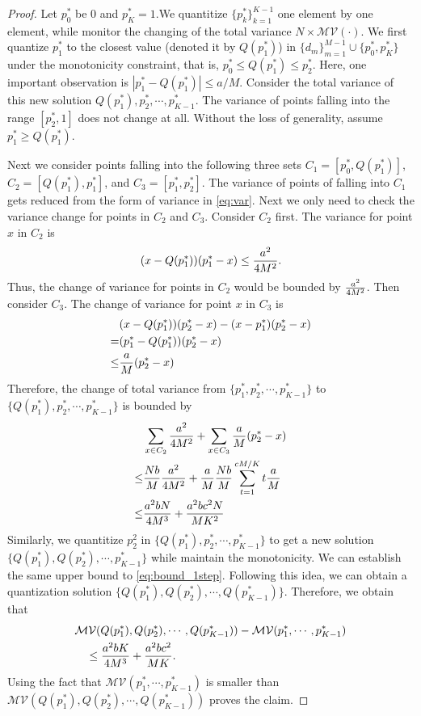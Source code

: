 \documentclass{article}
\begin{document}
\begin{proof}
Let $p^*_0$ be $0$ and $p^*_K=1$.We quantitize $\{p^*_k\}_{k=1}^{K-1}$ one element by one element, while monitor the changing of the total variance $N \times \mathcal{MV(\cdot)}$. We first quantize $p^*_1$ to the closest value (denoted it by $Q(p^*_1)$) in $\{d_m\}_{m=1}^{M-1} \cup \{p^*_0,p^*_K\}$ under the monotonicity constraint, that is, $p^*_0\leq Q(p^*_1) \leq p^*_2$. Here, one important observation is $|p^*_{1} - Q(p^*_1)|\leq a/M$. Consider the total variance of this new solution $Q(p^*_1), p^*_2, \cdots, p^*_{K-1}$. The variance of points falling into the range $[p^*_2, 1]$ does not change at all. Without the loss of generality, assume $p^*_{1} \geq Q(p^*_1)$.

Next we consider points falling into the following three sets $C_1 = [p^*_0, Q(p^*_1)]$, $C_2 = [Q(p^*_1), p^*_1]$, and $C_3 = [p^*_1, p^*_2]$. The variance of points of falling into $C_1$ gets reduced from the form of variance in \eqref{eq:var}. Next we only need to check the variance change for points in $C_2$ and $C_3$. Consider $C_2$ first. The variance for point $x$ in $C_2$ is
\[
(x-Q(p^*_1))(p^*_1 - x) \leq {a^2 \over 4 M^2}. 
\]  
Thus, the change of variance for points in $C_2$ would be bounded by ${a^2 \over 4 M^2}$. Then consider $C_3$. The change of variance for point $x$ in $C_3$ is
\begin{align*}
& (x-Q(p^*_1))(p^*_2 - x) - (x-p^*_1) (p^*_2 - x) 
\\
= & (p^*_1 - Q(p^*_1)) (p^*_2 - x)
\\
\leq & {a\over M}(p^*_2 - x)
\end{align*}
Therefore, the change of total variance from $\{p^*_1, p^*_2, \cdots, p^*_{K-1}\}$ to $\{Q(p^*_1), p^*_2, \cdots, p^*_{K-1}\}$ is bounded by 
\begin{align}
\nonumber
& \sum_{x\in C_2} {a^2 \over 4M^2} + \sum_{x \in C_3} {a\over M}(p^*_2 - x)
\\
\nonumber
\leq & {Nb \over M} {a^2 \over 4M^2} + {a\over M}{Nb \over M} \sum_{t=1}^{cM/K}t{a\over M}
\\
\leq &
{a^2b N \over 4 M^3} + {a^2bc^2 N \over MK^2}
\label{eq:bound_1step}
\end{align}
Similarly, we quantitize $p^2_2$ in $\{Q(p^*_1), p^*_2, \cdots, p^*_{K-1}\}$ to get a new solution $\{Q(p^*_1), Q(p^*_2), \cdots, p^*_{K-1}\}$ while maintain the monotonicity. We can establish the same upper bound to \eqref{eq:bound_1step}. Following this idea, we can obtain a quantization solution $\{Q(p^*_1), Q(p^*_2), \cdots, Q(p^*_{K-1})\}$. Therefore, we obtain that 
\begin{align*}
&  \mathcal{MV}(Q(p^*_1), Q(p^*_2), \cdots, Q(p^*_{K-1})) -  \mathcal{MV}({p}^*_1,\cdots, {p}^*_{K-1}) 
 \\
 & \quad \leq {a^2b K \over 4 M^3} + {a^2bc^2 \over MK}.
\end{align*}
Using the fact that $ \mathcal{MV}(p^*_1,\cdots, p^*_{K-1})$ is smaller than $\mathcal{MV}(Q(p^*_1), Q(p^*_2), \cdots, Q(p^*_{K-1}))$ proves the claim.
\end{proof}
\end{document}
